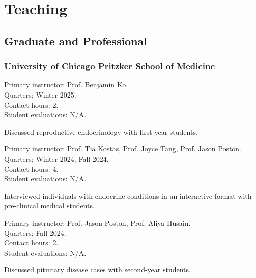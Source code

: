 \documentclass{komacv}
\begin{document}
\section{Teaching}

\subsection{Graduate and Professional}

\subsubsection{University of Chicago Pritzker School of Medicine}

{Primary instructor: Prof. Benjamin Ko.\\
Quarters: Winter 2025.\\
Contact hours: 2.\\
Student evaluations: N/A.
\begin{compactitem}
\item Discussed reproductive endocrinology with first-year students.
\end{compactitem}}

{Primary instructor: Prof. Tia Kostas, Prof. Joyce Tang, Prof. Jason Poston.\\
Quarters: Winter 2024, Fall 2024.\\
Contact hours: 4.\\
Student evaluations: N/A.
\begin{compactitem}
\item Interviewed individuals with endocrine conditions in an interactive format with pre-clinical medical students.
\end{compactitem}}

{Primary instructor: Prof. Jason Poston, Prof. Aliya Husain.\\
Quarters: Fall 2024.\\
Contact hours: 2.\\
Student evaluations: N/A.
\begin{compactitem}
\item Discussed pituitary disease cases with second-year students.
\end{compactitem}}
\end{document}
